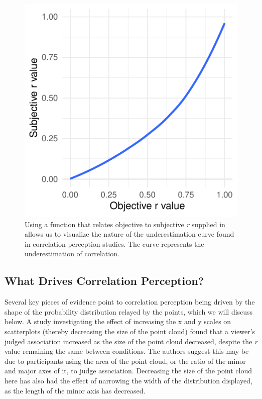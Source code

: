 \documentclass[preprint, 3p,
authoryear]{elsarticle} %
\begin{document}
\begin{figure}

\includegraphics{contrast_and_scatterplots_files/figure-latex/underestimation-curve-1} \hfill{}

\caption{\label{underestimation-curve}Using a function that relates objective to subjective \textit{r} supplied in \citep{rensink_2017} allows us to visualize the nature of the underestimation curve found in correlation perception studies. The curve represents the underestimation of correlation.}\label{fig:underestimation-curve}
\end{figure}

\hypertarget{what-drives-correlation-perception}{%
\subsection{What Drives Correlation
Perception?}\label{what-drives-correlation-perception}}

Several key pieces of evidence point to correlation perception being
driven by the shape of the probability distribution relayed by the
points, which we will discuss below. A study investigating the effect of
increasing the x and y scales on scatterplots (thereby decreasing the
size of the point cloud) \citep{cleveland_1982} found that a viewer's
judged association increased as the size of the point cloud decreased,
despite the \emph{r} value remaining the same between conditions. The
authors suggest this may be due to participants using the area of the
point cloud, or the ratio of the minor and major axes of it, to judge
association. Decreasing the size of the point cloud here has also had
the effect of narrowing the width of the distribution displayed, as the
length of the minor axis has decreased.
\end{document}
